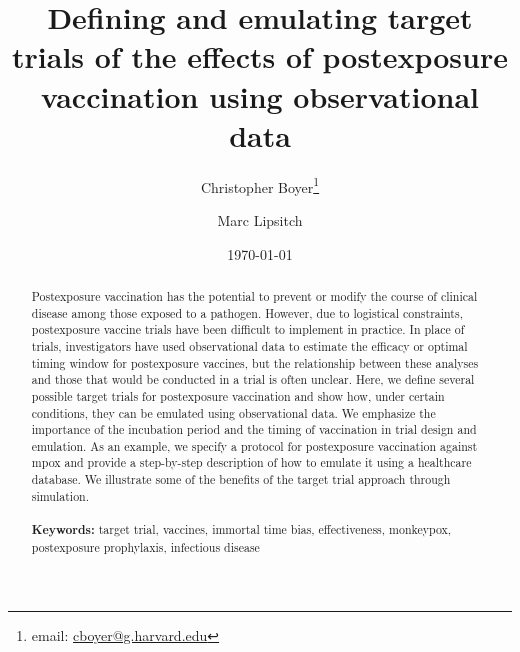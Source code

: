 \documentclass[11pt]{article}
\begin{document}
\begin{titlepage}
\title{Defining and emulating target trials of the effects of postexposure vaccination using observational data}
\author[1]{Christopher Boyer\thanks{email: \href{mailto:cboyer@g.harvard.edu}{cboyer@g.harvard.edu}}}
\author[1]{Marc Lipsitch}
\date{\today}
\maketitle

\begin{abstract}
Postexposure vaccination has the potential to prevent or modify the course of clinical disease among those exposed to a pathogen. However, due to logistical constraints, postexposure vaccine trials have been difficult to implement in practice. In place of trials, investigators have used observational data to estimate the efficacy or optimal timing window for postexposure vaccines, but the relationship between these analyses and those that would be conducted in a trial is often unclear. Here, we define several possible target trials for postexposure vaccination and show how, under certain conditions, they can be emulated using observational data. We emphasize the importance of the incubation period and the timing of vaccination in trial design and emulation. As an example, we specify a protocol for postexposure vaccination against mpox and provide a step-by-step description of how to emulate it using a healthcare database. We illustrate some of the benefits of the target trial approach through simulation.
\noindent \\
\vspace{0in} \\
\noindent\textbf{Keywords:} target trial, vaccines, immortal time bias, effectiveness, monkeypox, postexposure prophylaxis, infectious disease \\

\bigskip
\end{abstract}
\setcounter{page}{0}
\thispagestyle{empty}
\end{titlepage}
\pagebreak \newpage

\doublespacing
\end{document}
